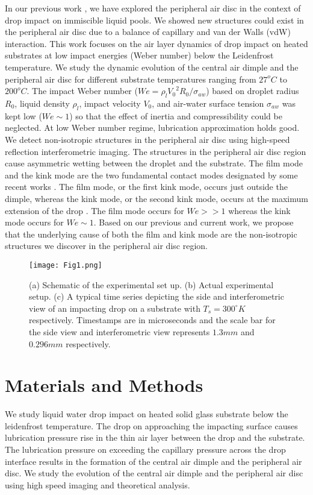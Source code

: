 \documentclass{jfm}
\begin{document}
In our previous work \citep{roy2022droplet}, we have explored the peripheral air disc in the context of drop impact on immiscible liquid pools. We showed new structures could exist in the peripheral air disc due to a balance of capillary and van der Walls (vdW) interaction.
This work focuses on the air layer dynamics of drop impact on heated substrates at low impact energies (Weber number) below the Leidenfrost temperature. We study the dynamic evolution of the central air dimple and the peripheral air disc for different substrate temperatures ranging from $27^oC$ to $200^oC$. The impact Weber number ($We={\rho}_l{V_0}^2R_0/{\sigma}_{aw}$) based on droplet radius $R_0$, liquid density ${\rho}_l$, impact velocity $V_0$, and air-water surface tension ${\sigma}_{aw}$ was kept low ($We{\sim}1$) so that the effect of inertia and compressibility could be neglected. At low Weber number regime, lubrication approximation holds good. We detect non-isotropic structures in the peripheral air disc using high-speed reflection interferometric imaging. The structures in the peripheral air disc region cause asymmetric wetting between the droplet and the substrate.  
The film mode and the kink mode are the two fundamental contact modes designated by some recent works \citep{de2015air-1,de2015air-2,li2015probing,langley2019gliding}. The film mode, or the first kink mode, occurs just outside the dimple, whereas the kink mode, or the second kink mode, occurs at the maximum extension of the drop \citep{chubynsky2020bouncing}. 
The film mode occurs for $We>>1$ whereas the kink mode occurs for $We{\sim}1$. Based on our previous \citep{roy2022droplet} and current work, we propose that the underlying cause of both the film and kink mode are the non-isotropic structures we discover in the peripheral air disc region.
\begin{figure*}
    \centering
    \texttt{[image: Fig1.png]}
    \caption{(a) Schematic of the experimental set up. (b) Actual experimental setup. (c) A typical time series depicting the side and interferometric view of an impacting drop on a substrate with $T_s=300^{\circ}K$ respectively. Timestamps are in microseconds and the scale bar for the side view and interferometric view represents $1.3mm$ and $0.296mm$ respectively.
    }
    \label{Figure1}
\end{figure*}


 \section{Materials and Methods}
 We study liquid water drop impact on heated solid glass substrate below the leidenfrost temperature.
 The drop on approaching the impacting surface causes lubrication pressure rise in the thin air layer between the drop and the substrate. The lubrication pressure on exceeding the capillary pressure across the drop interface results in the formation of the central air dimple and the peripheral air disc. We study the evolution of the central air dimple and the peripheral air disc using high speed imaging and theoretical analysis.
\end{document}
